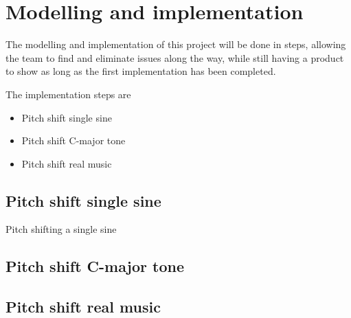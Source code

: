 
\chapter{Modelling and implementation}
\label{sec:modelandimpl}
The modelling and implementation of this project will be done in steps, allowing the team to find and eliminate issues along the way, while still having a product to show as long as the first implementation has been completed.

The implementation steps are
\begin{itemize}
	\item Pitch shift single sine
	\item Pitch shift C-major tone
	\item Pitch shift real music
\end{itemize}

\section{Pitch shift single sine}
Pitch shifting a single sine 

\section{Pitch shift C-major tone}

\section{Pitch shift real music}